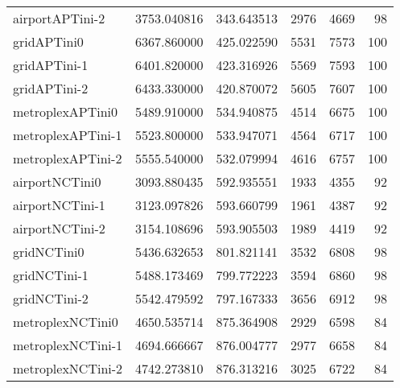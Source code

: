 \begin{table}[h]
\begin{longtable}{lrrrrr}
airportAPTini-2 & 3753.040816 & 343.643513 & 2976 & 4669 & 98 \\
gridAPTini0 & 6367.860000 & 425.022590 & 5531 & 7573 & 100 \\
gridAPTini-1 & 6401.820000 & 423.316926 & 5569 & 7593 & 100 \\
gridAPTini-2 & 6433.330000 & 420.870072 & 5605 & 7607 & 100 \\
metroplexAPTini0 & 5489.910000 & 534.940875 & 4514 & 6675 & 100 \\
metroplexAPTini-1 & 5523.800000 & 533.947071 & 4564 & 6717 & 100 \\
metroplexAPTini-2 & 5555.540000 & 532.079994 & 4616 & 6757 & 100 \\
airportNCTini0 & 3093.880435 & 592.935551 & 1933 & 4355 & 92 \\
airportNCTini-1 & 3123.097826 & 593.660799 & 1961 & 4387 & 92 \\
airportNCTini-2 & 3154.108696 & 593.905503 & 1989 & 4419 & 92 \\
gridNCTini0 & 5436.632653 & 801.821141 & 3532 & 6808 & 98 \\
gridNCTini-1 & 5488.173469 & 799.772223 & 3594 & 6860 & 98 \\
gridNCTini-2 & 5542.479592 & 797.167333 & 3656 & 6912 & 98 \\
metroplexNCTini0 & 4650.535714 & 875.364908 & 2929 & 6598 & 84 \\
metroplexNCTini-1 & 4694.666667 & 876.004777 & 2977 & 6658 & 84 \\
metroplexNCTini-2 & 4742.273810 & 876.313216 & 3025 & 6722 & 84 \\
\end{longtable}
\end{table}

